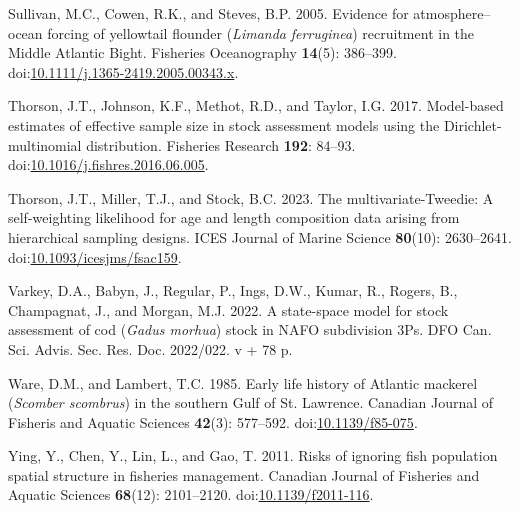 \documentclass[
]{article}
\newlength{\cslhangindent}
\newlength{\cslentryspacingunit} %
\newenvironment{CSLReferences}[2] %
 {%
  \setlength{\parindent}{0pt}
  \ifodd #1
  \let\oldpar\par
  \def\par{\hangindent=\cslhangindent\oldpar}
  \fi
  \setlength{\parskip}{#2\cslentryspacingunit}
 }%
 {}
\begin{document}
\begin{CSLReferences}{1}{0}
\leavevmode{}%
Sullivan, M.C., Cowen, R.K., and Steves, B.P. 2005. Evidence for atmosphere{--}ocean forcing of yellowtail flounder (\emph{{L}imanda} \emph{ferruginea}) recruitment in the {M}iddle {A}tlantic {B}ight. Fisheries Oceanography \textbf{14}(5): 386--399. doi:\href{https://doi.org/10.1111/j.1365-2419.2005.00343.x}{10.1111/j.1365-2419.2005.00343.x}.

\leavevmode{}%
Thorson, J.T., Johnson, K.F., Methot, R.D., and Taylor, I.G. 2017. Model-based estimates of effective sample size in stock assessment models using the {D}irichlet-multinomial distribution. Fisheries Research \textbf{192}: 84--93. doi:\href{https://doi.org/10.1016/j.fishres.2016.06.005}{10.1016/j.fishres.2016.06.005}.

\leavevmode{}%
Thorson, J.T., Miller, T.J., and Stock, B.C. 2023. The multivariate-{T}weedie: A self-weighting likelihood for age and length composition data arising from hierarchical sampling designs. ICES Journal of Marine Science \textbf{80}(10): 2630--2641. doi:\href{https://doi.org/10.1093/icesjms/fsac159}{10.1093/icesjms/fsac159}.

\leavevmode{}%
Varkey, D.A., Babyn, J., Regular, P., Ings, D.W., Kumar, R., Rogers, B., Champagnat, J., and Morgan, M.J. 2022. A state-space model for stock assessment of cod (\emph{{G}adus morhua}) stock in NAFO subdivision 3Ps. {DFO} {Can.} {Sci.} {Advis.} {Sec.} {Res.} {Doc.} 2022/022. v + 78 p.

\leavevmode{}%
Ware, D.M., and Lambert, T.C. 1985. Early life history of {A}tlantic mackerel (\emph{{S}comber scombrus}) in the southern {G}ulf of {S}t. {L}awrence. Canadian Journal of Fisheris and Aquatic Sciences \textbf{42}(3): 577--592. doi:\href{https://doi.org/10.1139/f85-075}{10.1139/f85-075}.

\leavevmode{}%
Ying, Y., Chen, Y., Lin, L., and Gao, T. 2011. Risks of ignoring fish population spatial structure in fisheries management. Canadian Journal of Fisheries and Aquatic Sciences \textbf{68}(12): 2101--2120. doi:\href{https://doi.org/10.1139/f2011-116}{10.1139/f2011-116}.

\end{CSLReferences}

\pagebreak

\pagebreak
\end{document}
